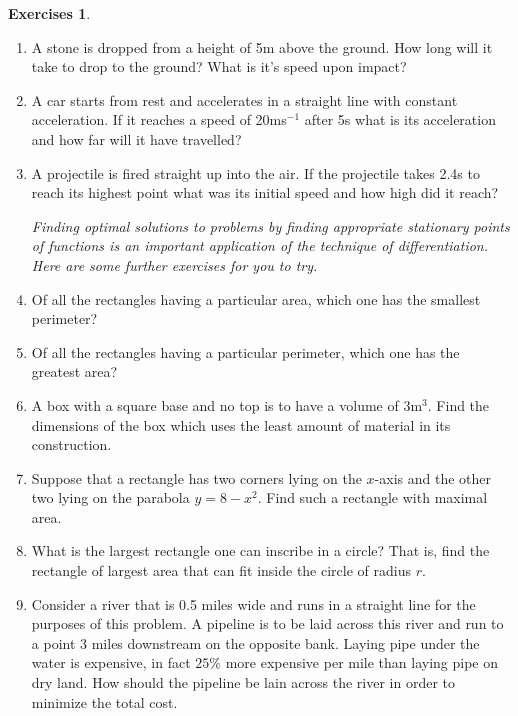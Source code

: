 \documentclass[extrafontsizes, twoside, a4paper]{memoir}
\theoremstyle{plain}%
\theoremstyle{definition}
\newtheorem{exer}{Exercises}[chapter]
\theoremstyle{remark}
\begin{document}
\begin{exer}
\begin{enumerate}
\vspace{ 0.5cm}

\textit{For these kinematics problems assume that the effects of air resistance can be ignored and that acceleration due to gravity is 9.8 ms$^{-2}$}.
\item
A stone is dropped from a height of 5m above the ground. How long will it take to drop to the ground? What is it's speed upon impact?
\item
A car starts from rest and accelerates in a straight line with constant acceleration. If it reaches a speed of 20ms$^{-1}$ after 5s what is its acceleration and how far will it have travelled?
\item
A projectile is fired straight up into the air. If the projectile takes 2.4s to reach its highest point what was its initial speed and how high did it reach?

\vspace{ 0.5cm}

\textit{Finding optimal solutions to problems by finding appropriate stationary points of functions is an important application of the technique of differentiation. Here are some further exercises for you to try.}
\item
Of all the rectangles having a particular area, which one has the smallest perimeter?
\item
Of all the rectangles having a particular perimeter, which one has the greatest area?
\item
A box with a square base and no top is to have a volume of 3$\text{m}^3$. Find the dimensions of the box which uses the least amount of material in its construction.
\item
Suppose that a rectangle has two corners lying on the $x$-axis and the other two lying on the parabola $y=8-x^2$. Find such a rectangle with maximal area.
\item
What is the largest rectangle one can inscribe in a circle? That is, find the rectangle of largest area that can fit inside the circle of radius $r$.
\item
Consider a river that is 0.5 miles wide and runs in a straight line for the purposes of this problem. A pipeline is to be laid across this river and run to a point 3 miles downstream on the opposite bank. Laying pipe under the water is expensive, in fact $25\%$ more expensive per mile than laying pipe on dry land. How should the pipeline be lain across the river in order to minimize the total cost.
\end{enumerate}
\end{exer}
\cleardoublepage
\end{document}
